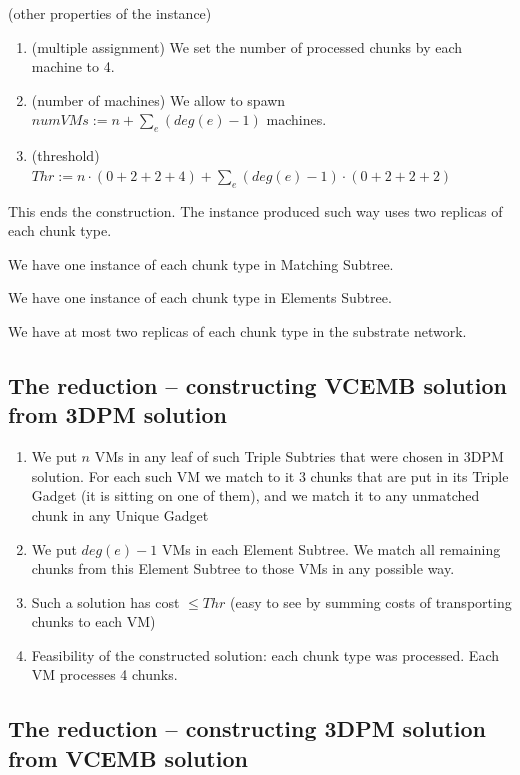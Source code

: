 (other properties of the instance)
\begin{enumerate}
\item (multiple assignment) We set the number of processed chunks by
  each machine to 4.
\item (number of machines) We allow to spawn
  $numVMs := n + \sum_{e}(deg(e)-1)$ machines.
\item (threshold)
  $Thr := n\cdot (0 + 2 + 2 + 4) + \sum_{e}(deg(e)-1)\cdot (0 + 2 + 2 + 2)$
\end{enumerate}

This ends the construction. The instance produced such way uses two replicas of each chunk type.

\begin{obs}
We have one instance of each chunk type in Matching Subtree.
\end{obs}

\begin{obs}
We have one instance of each chunk type in Elements Subtree.
\end{obs}

\begin{corollary}
We have at most two replicas of each chunk type in the substrate network.
\end{corollary}


\subsection{The reduction -- constructing VCEMB solution from 3DPM
  solution}

\begin{enumerate}
  \item We put $n$ VMs in any leaf of such Triple Subtries that were
  chosen in 3DPM solution. For each such VM we match to it 3 chunks
  that are put in its Triple Gadget (it is sitting on one of them),
  and we match it to any unmatched chunk in any Unique Gadget
  \item We put $deg(e)-1$ VMs in each Element Subtree. We match all remaining
  chunks from this Element Subtree to those VMs in any possible
  way.
  \item Such a solution has cost $\leq Thr$ (easy to see by
  summing costs of transporting chunks to each VM)
  \item Feasibility of the constructed solution: each chunk type was processed. Each VM processes 4 chunks.
\end{enumerate}

\subsection{The reduction -- constructing 3DPM solution from VCEMB
  solution}

